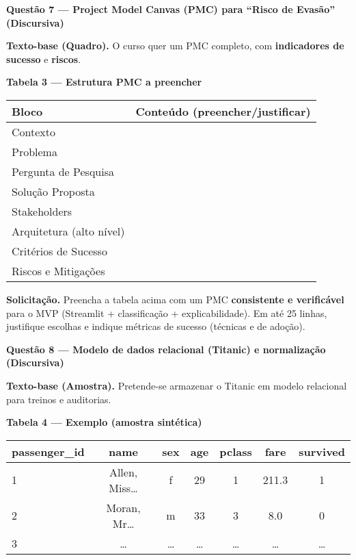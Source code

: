 \documentclass[12pt,a4paper]{article}
\begin{document}
\newpage
\noindent\textbf{Questão 7 — Project Model Canvas (PMC) para “Risco de Evasão” (Discursiva)}
\par\noindent\textbf{Texto-base (Quadro).} O curso quer um PMC completo, com \textbf{indicadores de sucesso} e \textbf{riscos}. 
\vspace{0.5em}

\noindent\textbf{Tabela 3 — Estrutura PMC a preencher}
\begin{center}
\begin{tabular}{p{}p{}}
\toprule
\textbf{Bloco} & \textbf{Conteúdo (preencher/justificar)}\\\midrule
Contexto & \\
Problema & \\
Pergunta de Pesquisa & \\
Solução Proposta & \\
Stakeholders & \\
Arquitetura (alto nível) & \\
Critérios de Sucesso & \\
Riscos e Mitigações & \\
\bottomrule
\end{tabular}
\end{center}

\noindent\textbf{Solicitação.} Preencha a tabela acima com um PMC \textbf{consistente e verificável} para o MVP (Streamlit + classificação + explicabilidade). Em até 25 linhas, justifique escolhas e indique métricas de sucesso (técnicas e de adoção).

\newpage
\noindent\textbf{Questão 8 — Modelo de dados relacional (Titanic) e normalização (Discursiva)}
\par\noindent\textbf{Texto-base (Amostra).} Pretende-se armazenar o Titanic em modelo relacional para treinos e auditorias.

\noindent\textbf{Tabela 4 — Exemplo (amostra sintética)}
\begin{center}
\begin{tabular}{lcccccc}
\toprule
\textbf{passenger\_id} & \textbf{name} & \textbf{sex} & \textbf{age} & \textbf{pclass} & \textbf{fare} & \textbf{survived}\\
\midrule
1 & Allen, Miss… & f & 29 & 1 & 211.3 & 1\\
2 & Moran, Mr… & m & 33 & 3 & 8.0 & 0\\
3 & … & … & … & … & … & …\\
\bottomrule
\end{tabular}
\end{center}
\end{document}
